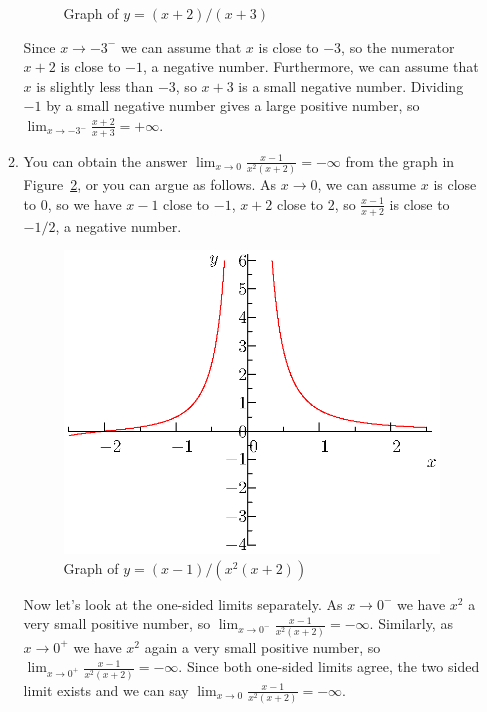 \documentclass{article}
\newcommand{\ds}{\displaystyle}
\begin{document}
\begin{enumerate}
\begin{enumerate}
\begin{figure}
\begin{center}
      \end{center}
      \caption{Graph of $y=(x+2)/(x+3)$}
      \label{fig:5a}
    \end{figure}
    Since $x\to -3^-$ we can assume that $x$ is close to $-3$,
    so the numerator $x+2$ is close to $-1$, a negative number.  Furthermore,
    we can assume that $x$ is slightly less than $-3$, so $x+3$ is a small
    negative number.  Dividing $-1$ by a small negative number gives a
    large positive number, so $\ds \lim_{x\to -3^-} \frac{x+2}{x+3} =+\infty$.
  \item %
    You can obtain the answer
    $\ds \lim_{x\to 0} \frac{x-1}{x^2(x+2)} = -\infty$
    from the graph in Figure~\ref{fig:5b}, or you can argue as follows.
    As $x\to 0$, we can assume $x$ is close to $0$, so we 
    have $x-1$ close to $-1$, $x+2$ close to $2$, so
    $\ds \frac{x-1}{x+2}$ is close to $-1/2$, a negative number.
    \begin{figure}
      \begin{center}
        \includegraphics{ps01q5b.eps}
      \end{center}
      \caption{Graph of $y=(x-1)/(x^2(x+2))$}
      \label{fig:5b}
    \end{figure}
    Now let's look at the one-sided limits separately.  As $x\to 0^-$ we have
    $x^2$ a very small positive number, so 
    $\ds \lim_{x\to 0^-} \frac{x-1}{x^2(x+2)} = -\infty$.  Similarly, as
    $x\to 0^+$ we have $x^2$ again a very small positive number, so
    $\ds \lim_{x\to 0^+} \frac{x-1}{x^2(x+2)} = -\infty$.  Since both one-sided
    limits agree, the two sided limit exists and we can say
    $\ds \lim_{x\to 0} \frac{x-1}{x^2(x+2)} = -\infty$.


\end{enumerate}
\end{enumerate}
\end{document}
